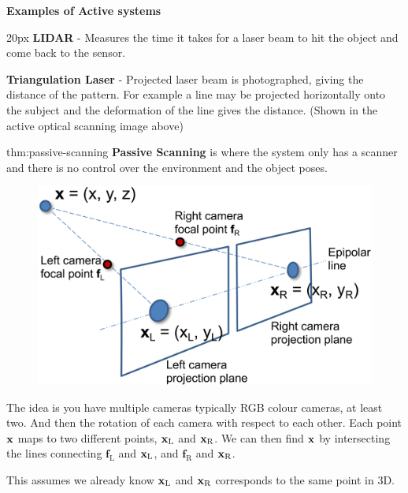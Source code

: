 \documentclass{article}
\begin{document}
\textbf{Examples of Active systems}

\vspace{10px}

\begin{addmargin}[20px]{20px}
    \textbf{LIDAR} - Measures the time it takes for a laser beam to hit the object and come back to the sensor.

    \vspace{5px}

    \textbf{Triangulation Laser} - Projected laser beam is photographed, giving the distance of the pattern.
    For example a line may be projected horizontally onto the subject and the deformation of the line gives 
    the distance. (Shown in the active optical scanning image above)
\end{addmargin}

\begin{defin}{thm:passive-scanning}
    \textbf{Passive Scanning} is where the system only has a scanner and there is no control over the
    environment and the object poses.
\end{defin}

\begin{figure}[!ht]
    \centering
    \includegraphics[width=0.5\linewidth]{images/passive_scanning.png}
\end{figure}

\vspace{10px}

The idea is you have multiple cameras typically RGB colour cameras, at least two. And then the rotation of each
camera with respect to each other. Each point \(\text{\textbf{x}}\) maps to two different points, \(\text{\textbf{x}}_{\text{L}}\)
and \(\text{\textbf{x}}_{\text{R}}\). We can then find \(\text{\textbf{x}}\) by intersecting the lines connecting
\(\mathbf{f}_{\text{L}}\) and \(\text{\textbf{x}}_{\text{L}}\), and \(\mathbf{f}_{\text{R}}\) and \(\text{\textbf{x}}_{\text{R}}\).

\vspace{5px}

This assumes we already know \(\text{\textbf{x}}_{\text{L}}\) and \(\text{\textbf{x}}_{\text{R}}\) corresponds to the same
point in 3D.
\end{document}
